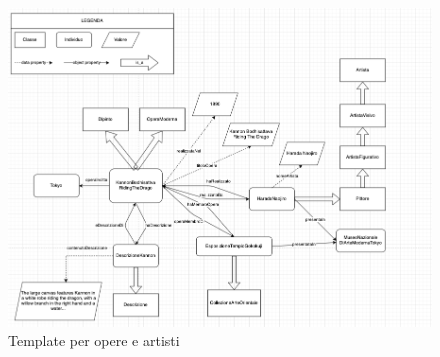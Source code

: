 \documentclass[12pt]{article}
\begin{document}
\begin{figure}[H]
   \includegraphics[scale=0.48]{fig/template Opera.png}
   \caption{Template per opere e artisti}\label{fig:picture}
\end{figure}
\end{document}
